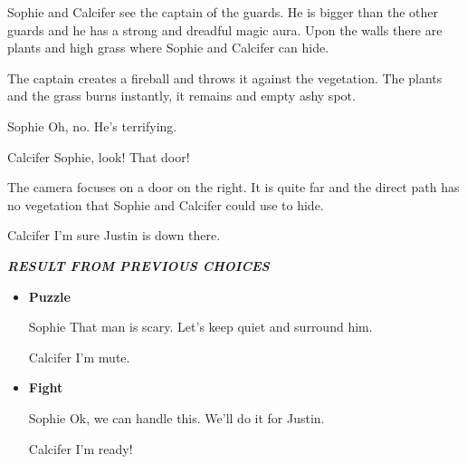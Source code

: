 
\begin{screenplay}

Sophie and Calcifer see the captain of the guards. He is bigger than the other guards and he has a strong and dreadful magic aura. Upon the walls there are plants and high grass where Sophie and Calcifer can hide.

The captain creates a fireball and throws it against the vegetation. The plants and the grass burns instantly, it remains and empty ashy spot.

\begin{dialogue}{Sophie}
Oh, no. He's terrifying.
\end{dialogue}

\begin{dialogue}{Calcifer}
Sophie, look! That door!
\end{dialogue}

The camera focuses on a door on the right. It is quite far and the direct path has no vegetation that Sophie and Calcifer could use to hide.

\begin{dialogue}[continuing]{Calcifer}
I'm sure Justin is down there.
\end{dialogue}

\end{screenplay}
\vspace{1em}

\textit{\textbf{RESULT FROM PREVIOUS CHOICES}}
\begin{itemize}
  \item \textbf{Puzzle}
  
\begin{screenplay}

\begin{dialogue}{Sophie}
  That man is scary. Let's keep quiet and surround him.
\end{dialogue}

\begin{dialogue}{Calcifer}
  I'm mute.
\end{dialogue}
  
\end{screenplay}
\vspace{1em}
  
  \item \textbf{Fight}
  
\begin{screenplay}

\begin{dialogue}[determined]{Sophie}
  Ok, we can handle this. We'll do it for Justin.
\end{dialogue}
  
\begin{dialogue}[determined]{Calcifer}
  I'm ready!
\end{dialogue}

\end{screenplay}
\vspace{1em}
  
\end{itemize}

